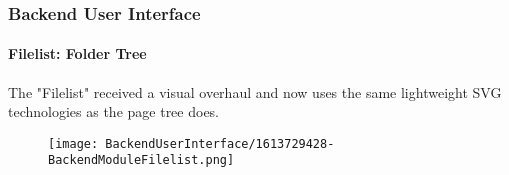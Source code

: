 %

\begin{frame}[fragile]
	\frametitle{Backend User Interface}
	\framesubtitle{Filelist: Folder Tree}

	The "Filelist" received a visual overhaul and now uses the same lightweight
	SVG technologies as the page tree does.

	\begin{figure}
		\texttt{[image: BackendUserInterface/1613729428-BackendModuleFilelist.png]}
	\end{figure}

\end{frame}

